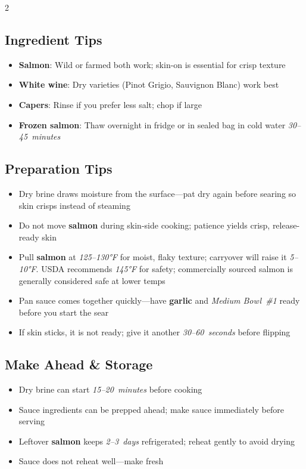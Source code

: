 \documentclass[11pt,letterpaper]{article}
\begin{document}
{\begin{multicols}{2}
\subsection*{Ingredient Tips}
\begin{itemize}
    \item \textbf{Salmon}: Wild or farmed both work; skin-on is essential for crisp texture
    \item \textbf{White wine}: Dry varieties (Pinot Grigio, Sauvignon Blanc) work best
    \item \textbf{Capers}: Rinse if you prefer less salt; chop if large
    \item \textbf{Frozen salmon}: Thaw overnight in fridge or in sealed bag in cold water \textit{30--45~minutes}
\end{itemize}

\subsection*{Preparation Tips}
\begin{itemize}
    \item Dry brine draws moisture from the surface---pat dry again before searing so skin crisps instead of steaming
    \item Do not move \textbf{salmon} during skin-side cooking; patience yields crisp, release-ready skin
    \item Pull \textbf{salmon} at \textit{125--130°F} for moist, flaky texture; carryover will raise it \textit{5--10°F}. USDA recommends \textit{145°F} for safety; commercially sourced salmon is generally considered safe at lower temps
    \item Pan sauce comes together quickly---have \textbf{garlic} and \textit{Medium Bowl~\#1} ready before you start the sear
    \item If skin sticks, it is not ready; give it another \textit{30--60~seconds} before flipping
\end{itemize}

\subsection*{Make Ahead \& Storage}
\begin{itemize}
    \item Dry brine can start \textit{15--20~minutes} before cooking
    \item Sauce ingredients can be prepped ahead; make sauce immediately before serving
    \item Leftover \textbf{salmon} keeps \textit{2--3~days} refrigerated; reheat gently to avoid drying
    \item Sauce does not reheat well---make fresh
\end{itemize}


\end{multicols}}
\end{document}
